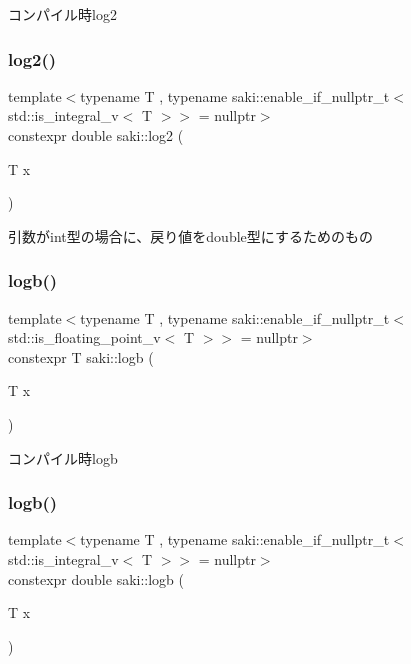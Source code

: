 コンパイル時log2 

\mbox{\label{namespacesaki_a8cb2f664389aab32abc797d9a60db4dc}} 
\subsubsection{\texorpdfstring{log2()}{log2()}\hspace{0.1cm}{\footnotesize\ttfamily [2/2]}}
{\footnotesize\ttfamily template$<$typename T , typename saki\+::enable\+\_\+if\+\_\+nullptr\+\_\+t$<$ std\+::is\+\_\+integral\+\_\+v$<$ T $>$$>$  = nullptr$>$ \\
constexpr double saki\+::log2 (\begin{DoxyParamCaption}\item[{T}]{x }\end{DoxyParamCaption})}



引数がint型の場合に、戻り値をdouble型にするためのもの 

\mbox{\label{namespacesaki_ab7e81af48b13fbf88f135d296471bac1}} 
\subsubsection{\texorpdfstring{logb()}{logb()}\hspace{0.1cm}{\footnotesize\ttfamily [1/2]}}
{\footnotesize\ttfamily template$<$typename T , typename saki\+::enable\+\_\+if\+\_\+nullptr\+\_\+t$<$ std\+::is\+\_\+floating\+\_\+point\+\_\+v$<$ T $>$$>$  = nullptr$>$ \\
constexpr T saki\+::logb (\begin{DoxyParamCaption}\item[{T}]{x }\end{DoxyParamCaption})}



コンパイル時logb 

\mbox{\label{namespacesaki_adf4ba562bb9897e98b75eb95027bfad5}} 
\subsubsection{\texorpdfstring{logb()}{logb()}\hspace{0.1cm}{\footnotesize\ttfamily [2/2]}}
{\footnotesize\ttfamily template$<$typename T , typename saki\+::enable\+\_\+if\+\_\+nullptr\+\_\+t$<$ std\+::is\+\_\+integral\+\_\+v$<$ T $>$$>$  = nullptr$>$ \\
constexpr double saki\+::logb (\begin{DoxyParamCaption}\item[{T}]{x }\end{DoxyParamCaption})}



